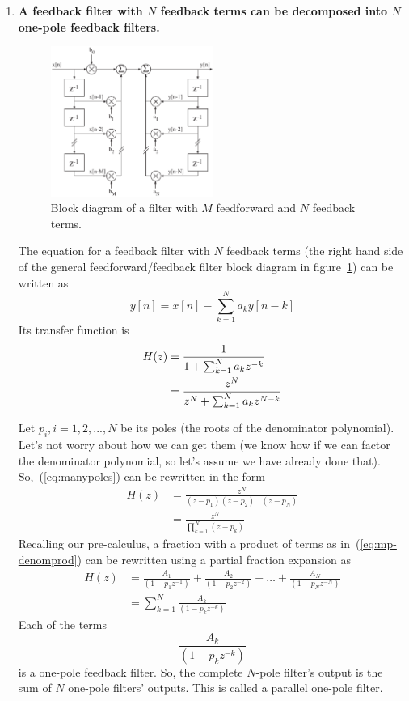 \begin{enumerate}
\item \textbf{A feedback filter with $N$ feedback terms can be decomposed into
$N$ one-pole feedback filters.}

\begin{figure}
\centerline{\includegraphics[width=0.5\textwidth]{ch-iir/fb-nterm-bdiag}}
\caption{Block diagram of a filter with $M$ feedforward and $N$
  feedback terms.\label{fig:fb-nterm-bdiag}}
\end{figure}

The equation for a feedback filter with $N$ feedback terms (the right
hand side of the general feedforward/feedback filter block diagram in
figure~\ref{fig:fb-nterm-bdiag}) can be written as
\begin{equation}
y[n] = x[n] - \sum_{k=1}^N a_k y[n-k]
\end{equation}
Its transfer function is 
\begin{align}
H(z) &= \frac{1}{1 + \sum_{k=1}^N a_k z^{-k}} \notag \\
     &= \frac{z^N}{z^N+\sum_{k=1}^N a_k z^{N-k}} \label{eq:manypoles}
\end{align}

Let $p_i, i=1, 2,...,N$ be its poles (the roots of the denominator
polynomial). Let's not worry about how we can get them (we know how if
we can factor the denominator polynomial, so let's assume we have
already done that).  So,~(\ref{eq:manypoles}) can be rewritten in the
form
\begin{align}
H(z) &= \frac{z^N}{(z-p_1)(z-p_2)\hdots (z-p_N)}\\
     &= \frac{z^N}{\prod_{k=1}^N(z-p_k)}\label{eq:mp-denomprod}
\end{align}
Recalling our pre-calculus, a fraction with a product of terms as
in~(\ref{eq:mp-denomprod}) can be rewritten using a partial fraction
expansion as 
\begin{align}
H(z) &= \frac{A_1}{(1-p_1z^{-1})}+\frac{A_2}{(1-p_2z^{-2})}+\hdots +
\frac{A_N}{(1-p_Nz^{-N})}\\
&= \sum_{k=1}^N\frac{A_k}{(1-p_k z^{-k})}
\end{align}
Each of the terms
\begin{equation}
\frac{A_k}{(1-p_k z^{-k})}
\end{equation}
is a one-pole feedback filter. So, the complete $N$-pole filter's
output is the sum of $N$ one-pole filters' outputs. This is called a
parallel one-pole filter.


\end{enumerate}
